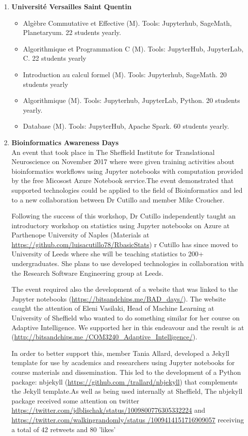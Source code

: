 \begin{enumerate}
\item \textbf{Université Versailles Saint Quentin}
  \begin{itemize}
  \item Algèbre Commutative et Effective (M). Tools: Jupyterhub,
    SageMath, Planetaryum. 22 students yearly.
  \item Algorithmique et Programmation C (M). Tools: JupyterHub,
    JupyterLab, C. 22 students yearly
  \item Introduction au calcul formel (M). Tools: Jupyterhub,
    SageMath. 20 students yearly
  \item Algorithmique (M). Tools: Jupyterhub, JupyterLab, Python. 20
    students yearly.
  \item Database (M). Tools: JupyterHub, Apache Spark. 60 students yearly.
 \end{itemize}

\item \textbf{ Bioinformatics Awareness Days}\\
An event that took place in The Sheffield Institute for Translational Neuroscience on November 2017 where were given training activities
about bioinformatics workflows using Jupyter notebooks with computation provided by the free Micosost Azure Notebook service.The event
demonstrated that \ODK supported technologies could be applied to the field of Bioinformatics and led to a new collaboration between Dr
Cutillo and \ODK member Mike Croucher.

Following the success of this workshop, Dr Cutillo independently taught an introductory workshop on statistics using Jupyter notebooks
on Azure at Parthenope University of Naples (Materials at \url{https://github.com/luisacutillo78/RbasicStats}) r Cutillo has since moved
to University of Leeds where she will be teaching statistics to 200+ undergraduates. She plans to use \ODK developed technologies
in collaboration with the Research Software Engineering group at Leeds.

The event required also the development of a website that was linked to the Jupyter notebooks (\url{https://bitsandchips.me/BAD_days/}). The
website caught the attention of Eleni Vasilaki, Head of Machine Learning at University of Sheffield who wanted to do something similar for
her course on Adaptive Intelligence. We supported her in this endeavour and the result is at (\url{http://bitsandchips.me
/COM3240_Adaptive_Intelligence/}).

In order to better support this, \ODK member Tania Allard, developed a Jekyll template for use by academics and researchers using Jupyter
notebooks for course materials and dissemination. This led to the development of a Python package: nbjekyll (\url{https://github.com
/trallard/nbjekyll}) that complements the Jekyll template.As well as being used internally at Sheffield, The nbjekyll package received some
attention on twitter \url{https://twitter.com/jdblischak/status/1009800776305332224} and \url{https://twitter.com/walkingrandomly/status
/1009414151716909057} receiving a total of 42 retweets and 80 'likes'%
\end{enumerate}

